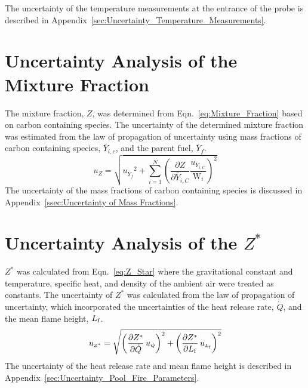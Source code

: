 \documentclass[12pt]{article}
\begin{document}
The uncertainty of the temperature measurements at the entrance of the probe is described in Appendix~\ref{sec:Uncertainty_Temperature_Measurements}.

\pagebreak

\section{Uncertainty Analysis of the Mixture Fraction}\label{sec:Uncertainty_Mix_Frac}
The mixture fraction, $Z$, was determined from Eqn.~\ref{eq:Mixture_Fraction} based on carbon containing species. The uncertainty of the determined mixture fraction was estimated from the law of propagation of uncertainty using mass fractions of carbon containing species, $\bar{Y}_{i,c}$, and the parent fuel, $\bar{Y}_{f}$.
\begin{equation}
\label{eq:mixture_frac_uncertainty}
u_{\scriptscriptstyle Z}=\sqrt{{u_{\scriptscriptstyle \bar{Y}_{f}}}^2+{\sum_{i=1}^{N}{\left(\frac{\partial Z}{\partial \bar{Y}_{i,C}}\frac{u_{\scriptscriptstyle \bar{Y}_{i,C}}}{\textrm{W}_{i}} \right)}^2}}
\end{equation}
The uncertainty of the mass fractions of carbon containing species is discussed in Appendix~\ref{ssec:Uncertainty of Mass Fractions}.

\pagebreak

\section{Uncertainty Analysis of the $Z^{*}$}\label{sec:Uncertainty_Z_star}
$Z^{*}$ was calculated from Eqn.~\ref{eq:Z_Star} where the gravitational constant and temperature, specific heat, and density of the ambient air were treated as constants. The uncertainty of $Z^{*}$ was calculated from the law of propagation of uncertainty, which incorporated the uncertainties of the heat release rate, $\dot{Q}$, and the mean flame height, $L_{\rm{f}}$.
\begin{equation}
\label{eq:heat_release_rate_uncertainty}
u_{\scriptscriptstyle Z^{*}} = \sqrt{{\left(\frac{\partial Z^{*}}{\partial \dot{Q}}\,u_{\scriptscriptstyle \dot{Q}} \right)}^2+{\left(\frac{\partial Z^{*}}{\partial L_{\rm{f}}}\,u_{\scriptscriptstyle L_{\rm{f}}} \right)}^2}
\end{equation}
The uncertainty of the heat release rate and mean flame height is described in Appendix~\ref{sec:Uncertainty_Pool_Fire_Parameters}.
\end{document}
